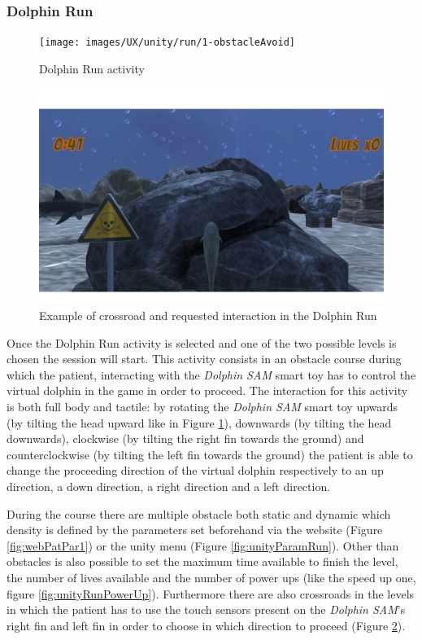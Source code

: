 \subsubsection{Dolphin Run}
\begin{figure}[h!]
	\texttt{[image: images/UX/unity/run/1-obstacleAvoid]}
	\caption{Dolphin Run activity}
	\label{fig:unityObstAvoid}
\end{figure}
\begin{figure}[h!]
	\includegraphics[width=\textwidth]{images/UX/unity/run/2-crossroad}
	\caption{Example of crossroad and requested interaction in the Dolphin Run}
	\label{fig:unityDolphRunCross}
\end{figure}
\pagebreak
Once the Dolphin Run activity is selected and one of the two possible levels is chosen the session will start.
This activity consists in an obstacle course during which the patient, interacting with the \textit{Dolphin SAM} smart toy has to control the virtual dolphin in the game in order to proceed.
The interaction for this activity is both full body and tactile: by rotating the \textit{Dolphin SAM} smart toy upwards (by tilting the head upward like in Figure \ref{fig:unityObstAvoid}), downwards (by tilting the head downwards), clockwise (by tilting the right fin towards the ground) and counterclockwise (by tilting the left fin towards the ground) the patient is able to change the proceeding direction of the virtual dolphin respectively to an up direction, a down direction, a right direction and a left direction.

During the course there are multiple obstacle both static and dynamic which density is defined by the parameters set beforehand via the website (Figure \ref{fig:webPatPar1}) or the unity menu (Figure \ref{fig:unityParamRun}). Other than obstacles is also possible to set the maximum time available to finish the level, the number of lives available and the number of power ups (like the speed up one, figure \ref{fig:unityRunPowerUp}).
 Furthermore there are also crossroads in the levels in which the patient has to use the touch sensors present on the \textit{Dolphin SAM}'s right fin and left fin in order to choose in which direction to proceed (Figure \ref{fig:unityDolphRunCross}).

